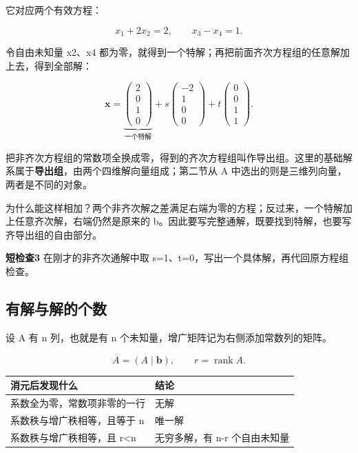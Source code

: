 \documentclass[
  11pt,
  a4paper,
  fontset=fandol]{ctexart}
\newcounter{none} %
\begin{document}
它对应两个有效方程：

\[x_1+2x_2=2,\qquad x_3-x_4=1.\]

令自由未知量 x2、x4
都为零，就得到一个特解；再把前面齐次方程组的任意解加上去，得到全部解：

\[\boxed{\boldsymbol x=
\underbrace{\begin{pmatrix}2\\0\\1\\0\end{pmatrix}}_{\text{一个特解}}
+s\begin{pmatrix}-2\\1\\0\\0\end{pmatrix}
+t\begin{pmatrix}0\\0\\1\\1\end{pmatrix}.}\]

把非齐次方程组的常数项全换成零，得到的齐次方程组叫作导出组。这里的基础解系属于\textbf{导出组}，由两个四维解向量组成；第二节从
A 中选出的则是三维列向量，两者是不同的对象。

为什么能这样相加？两个非齐次解之差满足右端为零的方程；反过来，一个特解加上任意齐次解，右端仍然是原来的
b。因此要写完整通解，既要找到特解，也要写齐导出组的自由部分。

\textbf{短检查3} 在刚才的非齐次通解中取
s=1、t=0，写出一个具体解，再代回原方程组检查。


\subsection{有解与解的个数}\label{ux6709ux89e3ux4e0eux89e3ux7684ux4e2aux6570}

设 A 有 n 列，也就是有 n 个未知量，增广矩阵记为右侧添加常数列的矩阵。

\[\overline A=(A\mid\boldsymbol b),\qquad r=\operatorname{rank}A.\]

{\def\LTcaptype{none} %
\begin{longtable}[]{@{}ll@{}}
\toprule\noalign{}
消元后发现什么 & 结论 \\
\midrule\noalign{}
\endhead
\bottomrule\noalign{}
\endlastfoot
系数全为零，常数项非零的一行 & 无解 \\
系数秩与增广秩相等，且等于 n & 唯一解 \\
系数秩与增广秩相等，且 r\textless n & 无穷多解，有 n-r 个自由未知量 \\
\end{longtable}
}
\end{document}
